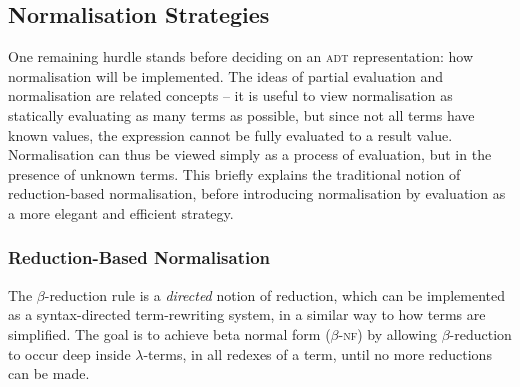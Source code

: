 \documentclass[../../../main.tex]{subfiles}
\begin{document}

\subsection{Normalisation Strategies}\label{sec:normalisation-approach}
One remaining hurdle stands before deciding on an \textsc{adt} representation: how normalisation will be implemented.
The ideas of partial evaluation and normalisation are related concepts -- it is useful to view normalisation as statically evaluating as many terms as possible, but since not all terms have known values, the expression cannot be fully evaluated to a result value.
Normalisation can thus be viewed simply as a process of evaluation, but in the presence of unknown terms.
This  briefly explains the traditional notion of reduction-based normalisation, before introducing normalisation by evaluation as a more elegant and efficient strategy.


\subsubsection{Reduction-Based Normalisation}
The $\beta$-reduction rule is a \emph{directed} notion of reduction, which can be implemented as a syntax-directed term-rewriting system, in a similar way to how  terms are simplified.
The goal is to achieve beta normal form ($\beta$-\textsc{nf}) by allowing $\beta$-reduction to occur deep inside $\lambda$-terms, in all redexes of a term, until no more reductions can be made.
\end{document}
